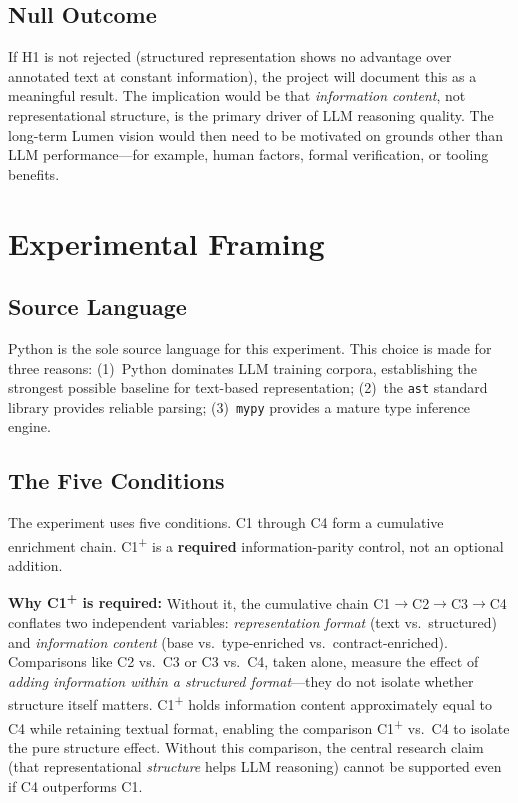 \documentclass[11pt]{article}
\begin{document}
\subsection*{Null Outcome}

If H1 is not rejected (structured representation shows no advantage
over annotated text at constant information), the project will
document this as a meaningful result.  The implication would be that
\emph{information content}, not representational structure, is the
primary driver of LLM reasoning quality.  The long-term Lumen vision
would then need to be motivated on grounds other than LLM
performance---for example, human factors, formal verification, or
tooling benefits.


\section{Experimental Framing}
\label{sec:experiment}

\subsection*{Source Language}

Python is the sole source language for this experiment.  This choice
is made for three reasons: (1)~Python dominates LLM training corpora,
establishing the strongest possible baseline for text-based
representation; (2)~the \texttt{ast} standard library provides
reliable parsing; (3)~\texttt{mypy} provides a mature type inference
engine.

\subsection*{The Five Conditions}

The experiment uses five conditions.  C1 through C4 form a cumulative
enrichment chain.  C1\textsuperscript{+} is a \textbf{required}
information-parity control, not an optional addition.

\textbf{Why C1\textsuperscript{+} is required:}  Without it, the
cumulative chain C1$\to$C2$\to$C3$\to$C4 conflates two independent
variables: \emph{representation format} (text vs.\ structured) and
\emph{information content} (base vs.\ type-enriched vs.\
contract-enriched).  Comparisons like C2 vs.\ C3 or C3 vs.\ C4,
taken alone, measure the effect of \emph{adding information within a
structured format}---they do not isolate whether structure itself
matters.  C1\textsuperscript{+} holds information content
approximately equal to C4 while retaining textual format, enabling
the comparison C1\textsuperscript{+} vs.\ C4 to isolate the pure
structure effect.  Without this comparison, the central research claim
(that representational \emph{structure} helps LLM reasoning) cannot be
supported even if C4 outperforms C1.
\end{document}
